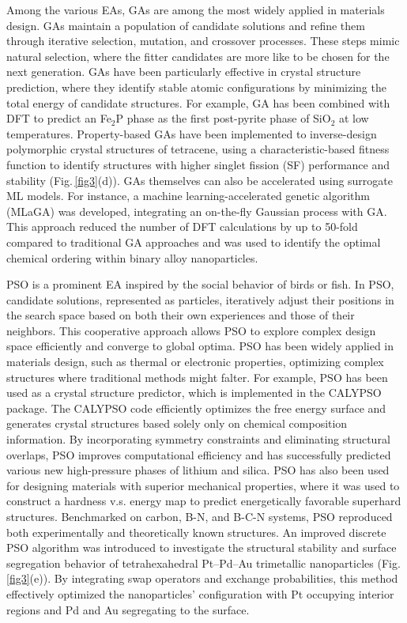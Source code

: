 \documentclass[fleqn,10pt]{wlscirep}
\begin{document}
Among the various EAs, GAs are among the most widely applied in materials design. GAs maintain a population of candidate solutions and refine them through iterative selection, mutation, and crossover processes. These steps mimic natural selection, where the fitter candidates are more like to be chosen for the next generation. GAs have been particularly effective in crystal structure prediction, where they identify stable atomic configurations by minimizing the total energy of candidate structures. For example, GA has been combined with DFT to predict an Fe$_2$P phase as the first post-pyrite phase of SiO$_2$ at low temperatures\cite{wu2011identification}.
Property-based GAs have been implemented to inverse-design polymorphic crystal structures of tetracene, using a characteristic-based fitness function to identify structures with higher singlet fission (SF) performance and stability\cite{tom2023inverse} (Fig.\,\ref{fig3}(d)). 
GAs themselves can also be accelerated using surrogate ML models. For instance, a machine learning-accelerated genetic algorithm (MLaGA) was developed, integrating an on-the-fly Gaussian process with GA. This approach reduced the number of DFT calculations by up to 50-fold compared to traditional GA approaches and was used to identify the optimal chemical ordering within binary alloy nanoparticles\cite{jennings2019genetic}.

PSO is a prominent EA inspired by the social behavior of birds or fish. In PSO, candidate solutions, represented as particles, iteratively adjust their positions in the search space based on both their own experiences and those of their neighbors. This cooperative approach allows PSO to explore complex design space efficiently and converge to global optima. PSO has been widely applied in materials design, such as thermal or electronic properties, optimizing complex structures where traditional methods might falter. For example, PSO has been used as a crystal structure predictor, which is implemented in the CALYPSO package\cite{wang2012calypso}. The CALYPSO code efficiently optimizes the free energy surface and generates crystal structures based solely only on chemical composition information\cite{wang2010crystal}. By incorporating symmetry constraints and eliminating structural overlaps, PSO improves computational efficiency and has successfully predicted various new high-pressure phases of lithium and silica. PSO has also been used for designing materials with superior mechanical properties, where it was used to construct a hardness v.s. energy map to predict energetically favorable superhard structures. Benchmarked on carbon, B-N, and B-C-N systems, PSO reproduced both experimentally and theoretically known structures\cite{zhang2013first}. An improved discrete PSO algorithm was introduced to investigate the structural stability and surface segregation behavior of tetrahexahedral Pt–Pd–Au trimetallic nanoparticles\cite{fan2015structural} (Fig.\,\ref{fig3}(e)). By integrating swap operators and exchange probabilities, this method effectively optimized the nanoparticles' configuration with Pt occupying interior regions and Pd and Au segregating to the surface. 
\end{document}
